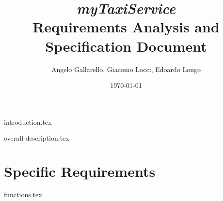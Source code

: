 \documentclass[12pt, a4paper]{article}
\begin{document}
\title{ \emph{ myTaxiService}\\ Requirements Analysis and Specification Document }

\author{Angelo Gallarello, Giacomo Locci, Edoardo Longo}
\date{\today}
\maketitle

\newpage

\tableofcontents

\newpage


{introduction.tex}

{overall-description.tex}

\section{Specific Requirements} %
\label{sec:specific_rquirements}


{functions.tex}

\end{document}

